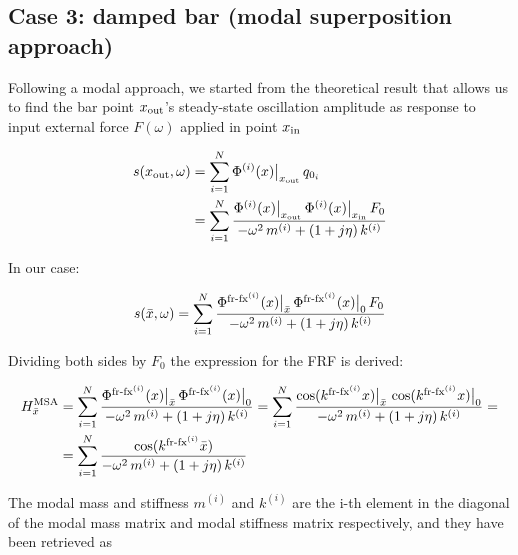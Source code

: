 \documentclass[a4paper,12pt,oneside]{article}
\begin{document}
\begin{figure}[h]
	\vspace{50pt}
	\centering
	\def\svgwidth{\columnwidth}
	
\end{figure}

\subsection*{Case 3: damped bar (modal superposition approach)}

Following a modal approach, we started from the theoretical result that allows us to find the bar point $ x_\textup{out} $'s steady-state oscillation amplitude as response to input external force $ F(\omega) $ applied in point $ x_\textup{in} $

\[ \begin{split}
	s(x_\textup{out}, \omega) & = %
		\sum_{i=1}^N \Phi^{(i)}(x)\big|_{x_\textup{out}} \, q_{0_i} \\
	& = \sum_{i=1}^N \frac{\Phi^{(i)}(x)\big|_{x_\textup{out}} \, %
		\Phi^{(i)}(x)\big|_{x_\textup{in}} \, F_0} %
		{-\omega^2 \, m^{(i)} + (1 + j \eta) \, k^{(i)}}
\end{split} \]

In our case:

\[ \begin{split}
	s(\bar{x},\omega) =
		\sum_{i=1}^N \frac{\Phi^{\textup{fr-fx}^{(i)}}(x)\big|_{\bar{x}} \,
		\Phi^{\textup{fr-fx}^{(i)}}(x)\big|_0 \, F_0}
		{-\omega^2 \, m^{(i)} + (1 + j \eta) \, k^{(i)}}
\end{split} \]

Dividing both sides by $ F_0 $ the expression for the FRF is derived:

\[ \begin{split}
	H^\textup{MSA}_{\bar{x}} & =
		\sum_{i=1}^N \frac{\Phi^{\textup{fr-fx}^{(i)}}(x)\big|_{\bar{x}} \,
		\Phi^{\textup{fr-fx}^{(i)}}(x)\big|_0}
		{-\omega^2 \, m^{(i)} + (1 + j \eta) \, k^{(i)}} =
		\sum_{i=1}^N \frac{\cos(k^{\textup{fr-fx}^{(i)}} x)\big|_{\bar{x}} \,
		\cos(k^{\textup{fr-fx}^{(i)}} x)\big|_0}
		{-\omega^2 \, m^{(i)} + (1 + j \eta) \, k^{(i)}} = \\
	& = \sum_{i=1}^N \frac{\cos(k^{\textup{fr-fx}^{(i)}} \bar{x})}
		{-\omega^2 \, m^{(i)} + (1 + j \eta) \, k^{(i)}}
\end{split} \]

\clearpage

The modal mass and stiffness $ m^{(i)} $ and $ k^{(i)} $ are the i-th element in the diagonal of the modal mass matrix and modal stiffness matrix respectively, and they have been retrieved as
\end{document}
